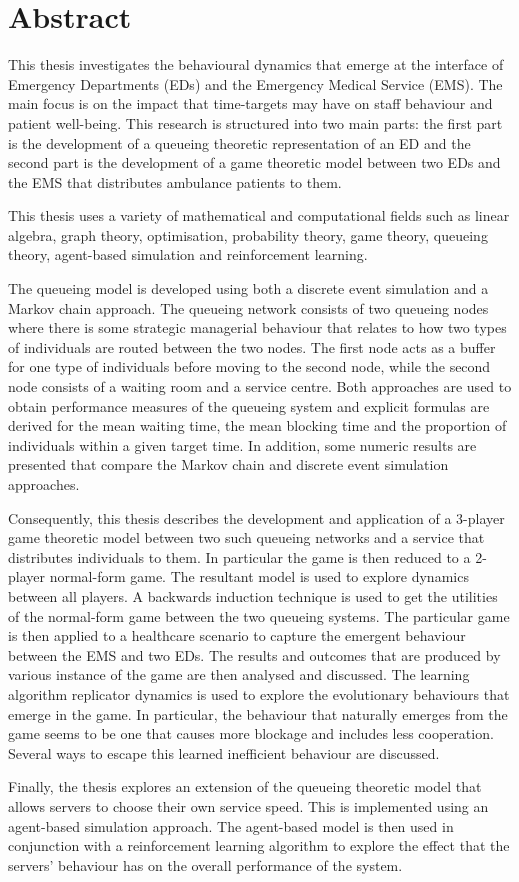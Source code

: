 \chapter*{Abstract}

This thesis investigates the behavioural dynamics that emerge at the
interface of Emergency Departments (EDs) and the Emergency Medical Service
(EMS).
The main focus is on the impact that time-targets may have on staff
behaviour and patient well-being.
This research is structured into two main parts: the first part is the
development of a queueing theoretic representation of an ED and the second
part is the development of a game theoretic model between two EDs and the
EMS that distributes ambulance patients to them.

This thesis uses a variety of mathematical and computational fields such as
linear algebra, graph theory, optimisation, probability theory, game
theory, queueing theory, agent-based simulation and reinforcement learning.

The queueing model is developed using both a discrete event simulation
and a Markov chain approach.
The queueing network consists of two queueing nodes where there is some
strategic managerial behaviour that relates to how two types of individuals
are routed between the two nodes.
The first node acts as a buffer for one type of individuals before moving 
to the second node, while the second node consists of a waiting room and a
service centre.
Both approaches are used to obtain performance measures of the queueing
system and explicit formulas are derived for the mean waiting time, the
mean blocking time and the proportion of individuals within a given target
time.
In addition, some numeric results are presented that compare the
Markov chain and discrete event simulation approaches.

Consequently, this thesis describes the development and application of a
3-player game  theoretic model between two such queueing networks and a
service that distributes individuals to them.
In particular the game is then reduced to a 2-player normal-form game.
The resultant model is used to explore dynamics between all players.
A backwards induction technique is used to get the utilities of the
normal-form game between the two queueing systems.
The particular game is then applied to a healthcare scenario to capture the
emergent behaviour between the EMS and two EDs.
The results and outcomes that are produced by various instance of the game
are then analysed and discussed.
The learning algorithm replicator dynamics is used to explore the
evolutionary behaviours that emerge in the game.
In particular, the behaviour that naturally emerges from the game seems to
be one that causes more blockage and includes less cooperation.
Several ways to escape this learned inefficient behaviour are discussed.

Finally, the thesis explores an extension of the queueing theoretic model
that allows servers to choose their own service speed.
This is implemented using an agent-based simulation approach.
The agent-based model is then used in conjunction with a reinforcement
learning algorithm to explore the effect that the servers' behaviour has 
on the overall performance of the system.

